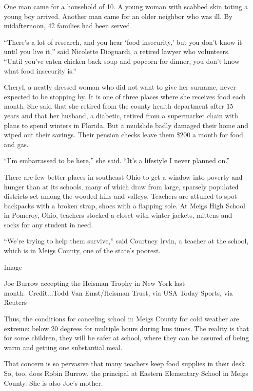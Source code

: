 One man came for a household of 10. A young woman with scabbed skin
toting a young boy arrived. Another man came for an older neighbor who
was ill. By midafternoon, 42 families had been served.

``There's a lot of research, and you hear `food insecurity,' but you
don't know it until you live it,'' said Nicolette Dioguardi, a retired
lawyer who volunteers. ``Until you've eaten chicken back soup and
popcorn for dinner, you don't know what food insecurity is.''

Cheryl, a neatly dressed woman who did not want to give her surname,
never expected to be stopping by. It is one of three places where she
receives food each month. She said that she retired from the county
health department after 15 years and that her husband, a diabetic,
retired from a supermarket chain with plans to spend winters in Florida.
But a mudslide badly damaged their home and wiped out their savings.
Their pension checks leave them \$200 a month for food and gas.

``I'm embarrassed to be here,'' she said. ``It's a lifestyle I never
planned on.''

There are few better places in southeast Ohio to get a window into
poverty and hunger than at its schools, many of which draw from large,
sparsely populated districts set among the wooded hills and valleys.
Teachers are attuned to spot backpacks with a broken strap, shoes with a
flapping sole. At Meigs High School in Pomeroy, Ohio, teachers stocked a
closet with winter jackets, mittens and socks for any student in need.

``We're trying to help them survive,'' said Courtney Irvin, a teacher at
the school, which is in Meigs County, one of the state's poorest.

Image

Joe Burrow accepting the Heisman Trophy in New York last
month.~Credit...Todd Van Emst/Heisman Trust, via USA Today Sports, via
Reuters

Thus, the conditions for canceling school in Meigs County for cold
weather are extreme: below 20 degrees for multiple hours during bus
times. The reality is that for some children, they will be safer at
school, where they can be assured of being warm and getting one
substantial meal.

That concern is so pervasive that many teachers keep food supplies in
their desk. So, too, does Robin Burrow, the principal at Eastern
Elementary School in Meigs County. She is also Joe's mother.

